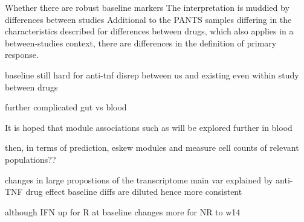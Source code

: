 \begin{outline}

Whether there are robust baseline markers
The interpretation is muddied by differences between studies
Additional to the \gls{PANTS} samples differing in the characteristics described for differences between drugs,
which also applies in a between-studies context,
there are differences in the definition of primary response.

    baseline still hard for anti-tnf
    disrep between us and existing
    even within study between drugs

further complicated gut vs blood

It is hoped that module associations
such as
will be explored further in blood

then, in terms of prediction,
eskew modules and measure cell counts of relevant populations??



%
changes in large propostions of the transcriptome
main var explained by anti-TNF drug
effect baseline diffs are diluted
hence more consistent

although IFN up for R at baseline
changes more for NR to w14



\end{outline}
